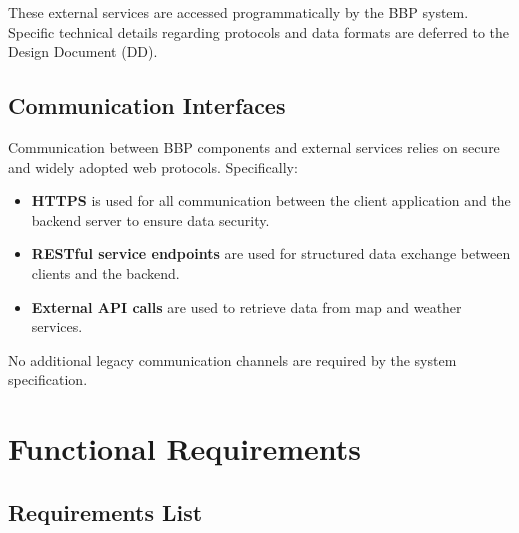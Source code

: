 \par These external services are accessed programmatically by the BBP system. Specific technical details regarding protocols and data formats are deferred to the Design Document (DD).

\subsection{Communication Interfaces}
\label{subsec:communication-interfaces}

\par Communication between BBP components and external services relies on secure and widely adopted web protocols. Specifically:

\begin{itemize}
    \item \textbf{HTTPS} is used for all communication between the client application and the backend server to ensure data security.
    \item \textbf{RESTful service endpoints} are used for structured data exchange between clients and the backend.
    \item \textbf{External API calls} are used to retrieve data from map and weather services.
\end{itemize}

\par No additional legacy communication channels are required by the system specification.

\section{Functional Requirements}
\label{sec:functional-requirements}

\subsection{Requirements List}
\label{subsec:requirements-list}

\setcounter{requirementCounter}{0}
\newcommand{\nextRequirementID}{
    \stepcounter{requirementCounter}R\ifnum\value{requirementCounter}<10 0\fi\arabic{requirementCounter}
}

